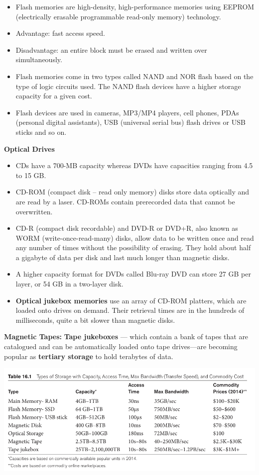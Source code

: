 \documentclass[10pt]{article}
\newcommand{\tf}{\textbf}
\begin{document}
\begin{itemize}
	\item Flash memories are high-density, high-performance memories using EEPROM (electrically erasable programmable read-only memory) technology. 
	\item Advantage: fast access speed.
	\item Disadvantage: an entire block must be erased and written over simultaneously. 
	\item Flash memories come in two types called NAND and NOR flash based on the type of logic circuits used. The NAND flash devices have a higher storage capacity for a given cost. 
	\item Flash devices are used in cameras, MP3/MP4 players, cell phones, PDAs (personal digital assistants), USB (universal serial bus) flash drives or USB sticks and so on.
\end{itemize}

\tf{Optical Drives}
\begin{itemize}
	\item CDs have a 700-MB capacity whereas DVDs have capacities ranging from 4.5 to 15 GB. 
	\item CD-ROM (compact disk – read only memory) disks store data optically and are read by a laser. CD-ROMs contain prerecorded data that cannot be overwritten.
	\item CD-R (compact disk recordable) and DVD-R or DVD+R, also known as WORM (write-once-read-many) disks, allow data to be written once and read any number of times without the possibility of erasing. They hold about half a gigabyte of data per disk and last much longer than magnetic disks. 
	\item A higher capacity format for DVDs called Blu-ray DVD can store 27 GB per layer, or 54 GB in a two-layer disk.  
	\item \tf{Optical jukebox memories} use an array of CD-ROM platters, which are loaded onto drives on demand. Their retrieval times are in the hundreds of milliseconds, quite a bit slower than magnetic disks. 
\end{itemize}

\tf{Magnetic Tapes:} \tf{Tape jukeboxes} — which contain a bank of tapes that are catalogued and can be automatically loaded onto tape drives—are becoming popular as \tf{tertiary storage} to hold terabytes of data. 

\bigbreak
\includegraphics[scale = 0.7]{typeStorage.png}
\bigbreak
\end{document}
